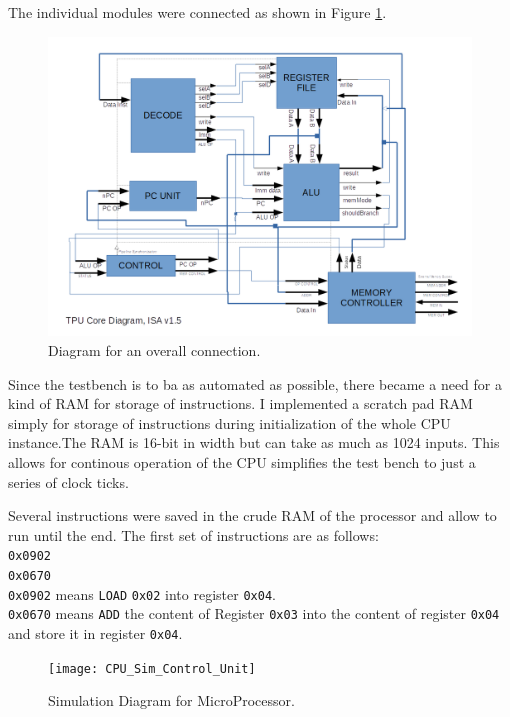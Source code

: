 The individual modules were connected as shown in Figure \ref{fig:TPU_CORE}.

\begin{figure}[p]
    \centering
    \includegraphics[scale = 0.6]{TPU_CORE}
	\caption{Diagram for an overall connection.}
    \label{fig:TPU_CORE}
\end{figure}
 
Since the testbench is to ba as automated as possible, there became a need for a kind of RAM for storage of instructions. I implemented a scratch pad RAM simply for storage of instructions during initialization of the whole CPU instance.The RAM is 16-bit in width but can take as much as 1024 inputs. This allows for continous operation of the CPU simplifies the test bench to just a series of clock ticks. 

Several instructions were saved in the crude RAM of the processor and allow to run until the end. 
The first set of instructions are as follows:\\
\verb|0x0902| \\
\verb|0x0670|	\\
\verb|0x0902| means \verb|LOAD| \verb|0x02| into register \verb|0x04|.\\
\verb|0x0670| means \verb|ADD| the content of Register \verb|0x03| into the content of register \verb|0x04| and store it in register \verb|0x04|.

\begin{figure}
    \centering
    \texttt{[image: CPU\_Sim\_Control\_Unit]}
	\caption{Simulation Diagram for MicroProcessor.}
    \label{fig:sim_cpu}
\end{figure}

